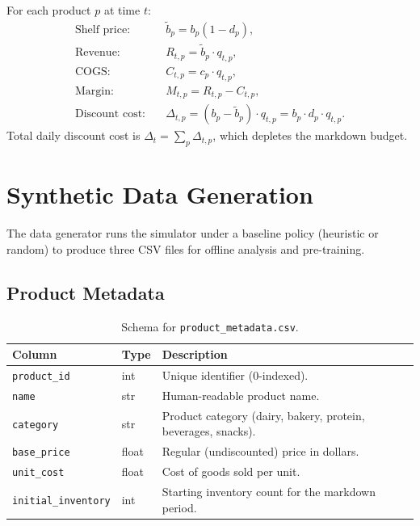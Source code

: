 \documentclass[11pt,a4paper]{article}
\begin{document}
For each product $p$ at time $t$:
\begin{align}
\text{Shelf price:} \quad & \tilde{b}_p = b_p (1 - d_p), \\
\text{Revenue:} \quad & R_{t,p} = \tilde{b}_p \cdot q_{t,p}, \\
\text{COGS:} \quad & C_{t,p} = c_p \cdot q_{t,p}, \\
\text{Margin:} \quad & M_{t,p} = R_{t,p} - C_{t,p}, \\
\text{Discount cost:} \quad & \Delta_{t,p} = (b_p - \tilde{b}_p) \cdot q_{t,p} = b_p \cdot d_p \cdot q_{t,p}.
\end{align}
Total daily discount cost is $\Delta_t = \sum_p \Delta_{t,p}$, which depletes the markdown budget.

\section{Synthetic Data Generation}
\label{sec:data_gen}

The data generator runs the simulator under a baseline policy (heuristic or random) to produce three CSV files for offline analysis and pre-training.

\subsection{Product Metadata}

\begin{table}[H]
\centering
\caption{Schema for \texttt{product\_metadata.csv}.}
\begin{tabular}{@{}llp{7cm}@{}}
\toprule
\textbf{Column} & \textbf{Type} & \textbf{Description} \\
\midrule
\texttt{product\_id} & int & Unique identifier (0-indexed). \\
\texttt{name} & str & Human-readable product name. \\
\texttt{category} & str & Product category (dairy, bakery, protein, beverages, snacks). \\
\texttt{base\_price} & float & Regular (undiscounted) price in dollars. \\
\texttt{unit\_cost} & float & Cost of goods sold per unit. \\
\texttt{initial\_inventory} & int & Starting inventory count for the markdown period. \\
\bottomrule
\end{tabular}
\end{table}
\end{document}
